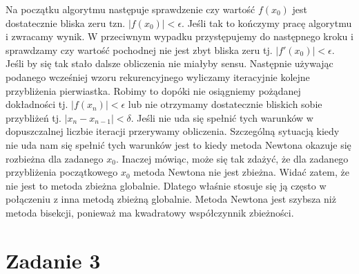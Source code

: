 \documentclass[]{article}
\begin{document}
	Na początku algorytmu następuje sprawdzenie czy wartość $f(x_0)$ jest dostatecznie bliska zeru tzn. $|f(x_0)|<\epsilon$. Jeśli tak to kończymy pracę algorytmu i zwracamy wynik. W przeciwnym wypadku przystępujemy do następnego kroku i sprawdzamy czy wartość pochodnej nie jest zbyt bliska zeru tj. $|f'(x_0)|<\epsilon$. Jeśli by się tak stało dalsze obliczenia nie miałyby sensu. Następnie używając podanego wcześniej wzoru rekurencyjnego wyliczamy iteracyjnie kolejne przybliżenia pierwiastka. Robimy to dopóki nie osiągniemy pożądanej dokładności tj. $|f(x_n)|<\epsilon$ lub nie otrzymamy dostatecznie bliskich sobie przybliżeń tj. $|x_n-x_{n-1}|<\delta$. Jeśli nie uda się spełnić tych warunków w dopuszczalnej liczbie iteracji przerywamy obliczenia. Szczególną sytuacją kiedy nie uda nam się spełnić tych warunków jest to kiedy metoda Newtona okazuje się rozbieżna dla zadanego $x_0$. Inaczej mówiąc, może się tak zdażyć, że dla zadanego przybliżenia początkowego $x_0$ metoda Newtona nie jest zbieżna. Widać zatem, że nie jest to metoda zbieżna globalnie. Dlatego właśnie stosuje się ją często w połączeniu z inna metodą zbieżną globalnie.
	Metoda Newtona jest szybsza niż metoda bisekcji, ponieważ ma kwadratowy współczynnik zbieżności.
	\\

	\section*{Zadanie 3} 
	
\end{document}
